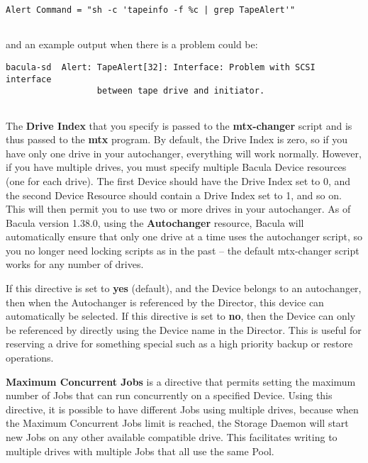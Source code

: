 \begin{description}
\footnotesize
\begin{verbatim}
Alert Command = "sh -c 'tapeinfo -f %c | grep TapeAlert'"
      
\end{verbatim}
\normalsize

and an example output when there is a problem could be:  

\footnotesize
\begin{verbatim}
bacula-sd  Alert: TapeAlert[32]: Interface: Problem with SCSI interface
                  between tape drive and initiator.
      
\end{verbatim}
\normalsize

\item [Drive Index = {\it number}]
   The {\bf Drive Index} that you specify is passed to the {\bf
   mtx-changer} script and is thus passed to the {\bf mtx} program.  By
   default, the Drive Index is zero, so if you have only one drive in your
   autochanger, everything will work normally.  However, if you have
   multiple drives, you must specify multiple Bacula Device resources (one
   for each drive).  The first Device should have the Drive Index set to 0,
   and the second Device Resource should contain a Drive Index set to 1,
   and so on.  This will then permit you to use two or more drives in your
   autochanger.  As of Bacula version 1.38.0, using the {\bf Autochanger}
   resource, Bacula will automatically ensure that only one drive at a time
   uses the autochanger script, so you no longer need locking scripts as in
   the past -- the default mtx-changer script works for any number of
   drives.

\item [Autoselect = {\it yes\vb{}no}]
   If this directive is set to {\bf yes} (default), and the Device
   belongs to an autochanger, then when the Autochanger is referenced
   by the Director, this device can automatically be selected. If this
   directive is set to {\bf no}, then the Device can only be referenced
   by directly using the Device name in the Director. This is useful
   for reserving a drive for something special such as a high priority
   backup or restore operations.

\item[Maximum Concurrent Jobs = {\it num}]

{\bf Maximum Concurrent Jobs} is a directive that permits setting the maximum
number of Jobs that can run concurrently on a specified Device.  Using this
directive, it is possible to have different Jobs using multiple drives, because
when the Maximum Concurrent Jobs limit is reached, the Storage Daemon will
start new Jobs on any other available compatible drive.  This facilitates
writing to multiple drives with multiple Jobs that all use the same Pool.


\end{description}
